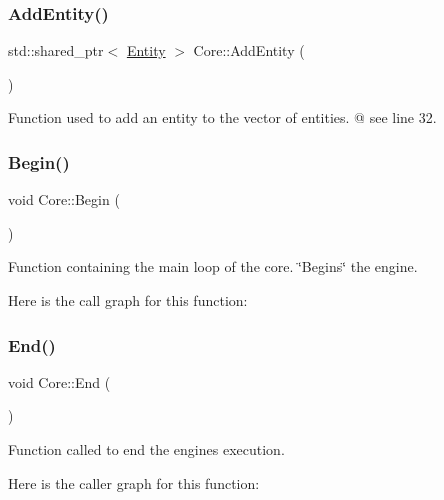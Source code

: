 \subsubsection{\texorpdfstring{Add\+Entity()}{AddEntity()}}
{\footnotesize\ttfamily std\+::shared\+\_\+ptr$<$ \mbox{\hyperlink{class_disc___engine_1_1_entity}{Entity}} $>$ Core\+::\+Add\+Entity (\begin{DoxyParamCaption}{ }\end{DoxyParamCaption})}



Function used to add an entity to the vector of entities. @ see line 32. 

\mbox{\label{class_disc___engine_1_1_core_a80e509698ac326255a17b7fff33f2f92}} 
\subsubsection{\texorpdfstring{Begin()}{Begin()}}
{\footnotesize\ttfamily void Core\+::\+Begin (\begin{DoxyParamCaption}{ }\end{DoxyParamCaption})}



Function containing the main loop of the core. \char`\"{}\+Begins\char`\"{} the engine. 

Here is the call graph for this function\+:
\mbox{\label{class_disc___engine_1_1_core_a247c426bb4f51c0caa406bccb85d7d3c}} 
\subsubsection{\texorpdfstring{End()}{End()}}
{\footnotesize\ttfamily void Core\+::\+End (\begin{DoxyParamCaption}{ }\end{DoxyParamCaption})}



Function called to end the engine\textquotesingle{}s execution. 

Here is the caller graph for this function\+:
\mbox{\label{class_disc___engine_1_1_core_a74c28b745ea29cd2dab65a14c7eb08b4}} 
